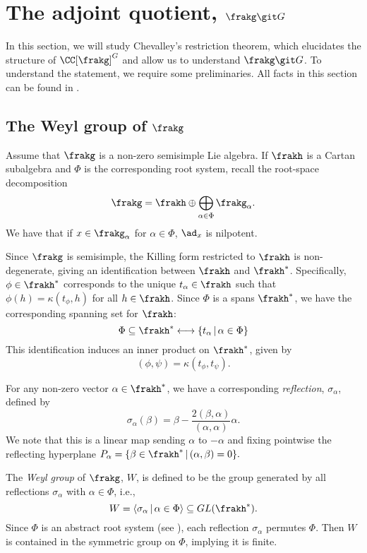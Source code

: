 \newpage
\section{The adjoint quotient, $\frakg \git G$}
In this section, we will study Chevalley's restriction theorem, which elucidates the structure of $\CC[\frakg]^G$ and allow us to understand $\frakg \git G$.
To understand the statement, we require some preliminaries.
All facts in this section can be found in \cite{Humphreys72}.

\subsection{The Weyl group of $\frakg$}
Assume that $\frakg$ is a non-zero semisimple Lie algebra.
If $\frakh$ is a Cartan subalgebra and $\Phi$ is the corresponding root system, recall the root-space decomposition
$$\frakg = \frakh \oplus \bigoplus_{\alpha \in \Phi} \frakg_\alpha.$$
We have that if $x \in \frakg_\alpha$ for $\alpha \in \Phi$, $\ad_x$ is nilpotent.

Since $\frakg$ is semisimple, the Killing form restricted to $\frakh$ is non-degenerate, giving an identification between $\frakh$ and $\frakh^*$.
Specifically, $\phi \in \frakh^*$ corresponds to the unique $t_\alpha \in \frakh$ such that $\phi(h) = \kappa(t_\phi, h)$ for all $h \in \frakh$.
Since $\Phi$ is a spans $\frakh^*$, we have the corresponding spanning set for $\frakh$:
$$\Phi \subseteq \frakh^* \longleftrightarrow \{t_\alpha \, | \, \alpha \in \Phi\}$$
This identification induces an inner product on $\frakh^*$, given by
$$(\phi, \psi) = \kappa(t_\phi, t_\psi).$$

For any non-zero vector $\alpha \in \frakh^*$, we have a corresponding \emph{reflection}, $\sigma_\alpha$, defined by
$$\sigma_\alpha(\beta) = \beta - \frac{2 (\beta, \alpha)}{(\alpha, \alpha)} \alpha.$$
We note that this is a linear map sending $\alpha$ to $-\alpha$ and fixing pointwise the reflecting hyperplane $P_\alpha = \{\beta \in \frakh^*\, | \, (\alpha, \beta)=0\}.$

The \emph{Weyl group} of $\frakg$, $W$, is defined to be the group generated by all reflections $\sigma_\alpha$ with $\alpha \in \Phi$, i.e.,
$$W =\langle \sigma_\alpha \, | \, \alpha \in \Phi \rangle \subseteq GL(\frakh^*).$$
Since $\Phi$ is an abstract root system (see \cite[\S 9.2]{Humphreys72}), each reflection $\sigma_\alpha$ permutes $\Phi$.
Then $W$ is contained in the symmetric group on $\Phi$, implying it is finite.

